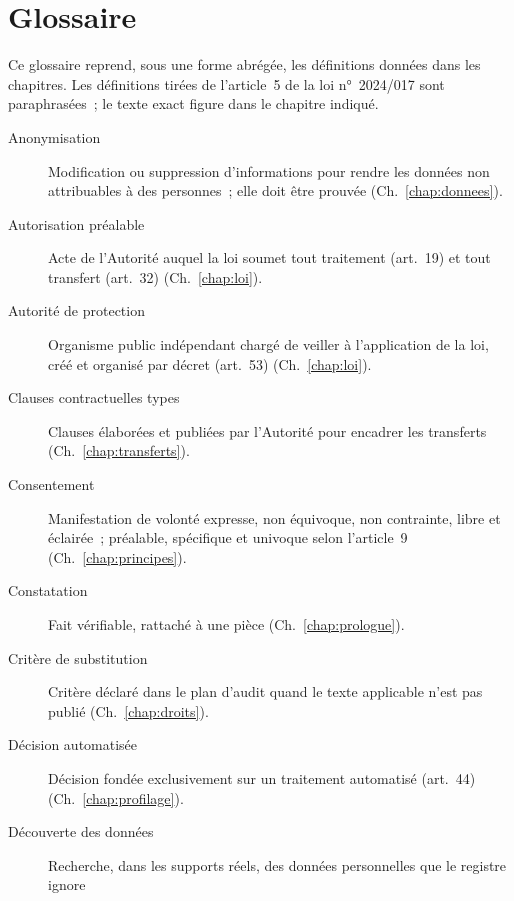 
\chapter{Glossaire}
\label{ann:glossaire}

Ce glossaire reprend, sous une forme abrégée, les définitions données dans
les chapitres. Les définitions tirées de l'article~5 de la loi n°~2024/017
sont paraphrasées~; le texte exact figure dans le chapitre indiqué.

\begin{description}
    \item[Anonymisation] Modification ou suppression d'informations pour
          rendre les données non attribuables à des personnes~; elle doit
          être prouvée (Ch.~\ref{chap:donnees}).
    \item[Autorisation préalable] Acte de l'Autorité auquel la loi soumet
          tout traitement (art.~19) et tout transfert (art.~32)
          (Ch.~\ref{chap:loi}).
    \item[Autorité de protection] Organisme public indépendant chargé de
          veiller à l'application de la loi, créé et organisé par décret
          (art.~53) (Ch.~\ref{chap:loi}).
    \item[Clauses contractuelles types] Clauses élaborées et publiées par
          l'Autorité pour encadrer les transferts (Ch.~\ref{chap:transferts}).
    \item[Consentement] Manifestation de volonté expresse, non équivoque, non
          contrainte, libre et éclairée~; préalable, spécifique et univoque
          selon l'article~9 (Ch.~\ref{chap:principes}).
    \item[Constatation] Fait vérifiable, rattaché à une pièce
          (Ch.~\ref{chap:prologue}).
    \item[Critère de substitution] Critère déclaré dans le plan d'audit
          quand le texte applicable n'est pas publié (Ch.~\ref{chap:droits}).
    \item[Décision automatisée] Décision fondée exclusivement sur un
          traitement automatisé (art.~44) (Ch.~\ref{chap:profilage}).
    \item[Découverte des données] Recherche, dans les supports réels, des
          données personnelles que le registre ignore

\end{description}
